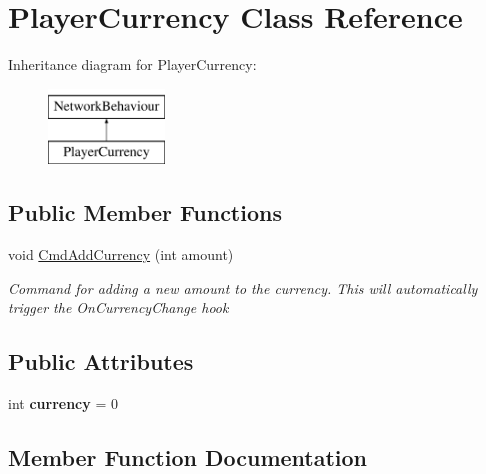 \hypertarget{class_player_currency}{}\section{Player\+Currency Class Reference}
\label{class_player_currency}
Inheritance diagram for Player\+Currency\+:\begin{figure}[H]
\begin{center}
\leavevmode
\includegraphics[height=2.000000cm]{class_player_currency}
\end{center}
\end{figure}
\subsection*{Public Member Functions}
\begin{DoxyCompactItemize}
\item 
void \hyperlink{class_player_currency_abc4d83a7cc985bbb008af57360be7e58}{Cmd\+Add\+Currency} (int amount)
\begin{DoxyCompactList}\small\item\em Command for adding a new amount to the currency. This will automatically trigger the On\+Currency\+Change hook \end{DoxyCompactList}\end{DoxyCompactItemize}
\subsection*{Public Attributes}
\begin{DoxyCompactItemize}
\item 
\hypertarget{class_player_currency_adc8b1be4f8fa03b748acc7d388189fcf}{}\label{class_player_currency_adc8b1be4f8fa03b748acc7d388189fcf} 
int {\bfseries currency} = 0
\end{DoxyCompactItemize}


\subsection{Member Function Documentation}
\hypertarget{class_player_currency_abc4d83a7cc985bbb008af57360be7e58}{}\label{class_player_currency_abc4d83a7cc985bbb008af57360be7e58} 
